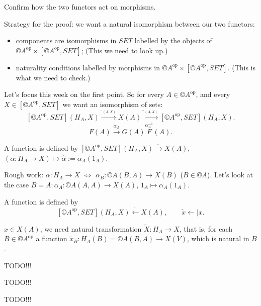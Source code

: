 \documentclass[12pt]{article}					%
\newcommand{\op}{^{\text{op}}}
\begin{document}
\begin{priklad}
	Confirm how the two functors act on morphisms.
\end{priklad}

\begin{dukaz}[Yoneda]
	Strategy for the proof: we want a natural isomorphism between our two functors:
	\begin{itemize}
		\item components are isomorphisms in $SET$ labelled by the objects of $©A\op \times [©A\op, SET]$; (This we need to look up.)
		\item naturality conditions labelled by morphisms in $©A\op \times [©A\op, SET]$. (This is what we need to check.)
	\end{itemize}

	Let's focus this week on the first point. So for every $A \in ©A\op$, and every $X \in [©A\op, SET]$ we want an isomorphism of sets:
	$$ [©A\op, SET](H_A, X) \overset{\hat{\ }_{(A, X)}}\rightarrow X(A) \overset{\tilde{\ }_{(A, X)}}\rightarrow [©A\op, SET](H_A, X). $$
	$$ F(A) \overset{α_A}\rightarrow G(A) \overset{α_A^{-1}} F(A). $$

	\begin{lemmain}[Observation]
		A function is defined by $[©A\op, SET](H_A, X) \overset{\hat{\ }}\rightarrow X(A)$, $(α: H_A \rightarrow X) \mapsto \hat{α} := α_A(1_A)$.

		Rough work: $α: H_A \rightarrow X$ $\Leftrightarrow$ $α_B: ©A(B, A) \rightarrow X(B)$ ($B \in ©A$). Let's look at the case $B = A: α_A: ©A(A, A) \rightarrow X(A)$, $1_A \mapsto α_A(1_A)$.
	\end{lemmain}

	\begin{lemmain}
		A function is defined by
		$$ [©A\op, SET](H_A, X) \overset{\tilde{\ }}\leftarrow X(A), \qquad \tilde x \leftarrow| x. $$
	\end{lemmain}

	\begin{dukazin}
		$x \in X(A)$, we need natural transformation $\tilde X: H_A \rightarrow X$, that is, for each $B \in ©A\op$ a function $\tilde x_B: H_A(B) = ©A(B, A) \rightarrow X(V)$, which is natural in $B$.

		TODO!!!
	\end{dukazin}

	TODO!!!
\end{dukaz}


TODO!!!
\end{document}
